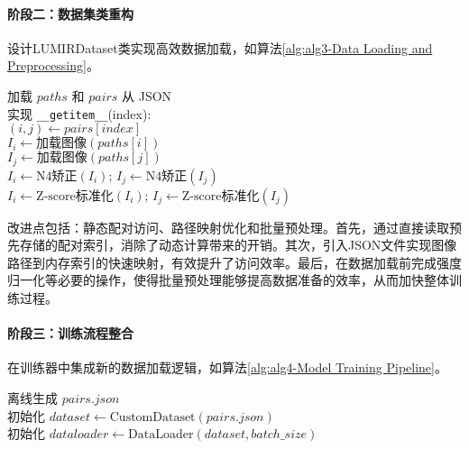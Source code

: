 \paragraph{阶段二：数据集类重构}
设计LUMIRDataset类实现高效数据加载，如算法\ref{alg:alg3-Data Loading and Preprocessing}。

\begin{algorithm}

    \label{alg:alg3-Data Loading and Preprocessing}

    加载 $paths$ 和 $pairs$ 从 JSON \\
    实现 \texttt{\_\_getitem\_\_}(index): \\
    \Indp
    $(i,j) \gets pairs[index]$ \\
    $I_i \gets \text{加载图像}(paths[i])$ \\
    $I_j \gets \text{加载图像}(paths[j])$ \\
    $I_i \gets \text{N4矫正}(I_i)$; $I_j \gets \text{N4矫正}(I_j)$ \\
    $I_i \gets \text{Z-score标准化}(I_i)$; $I_j \gets \text{Z-score标准化}(I_j)$ \\
    
\end{algorithm}

改进点包括：静态配对访问、路径映射优化和批量预处理。首先，通过直接读取预先存储的配对索引，消除了动态计算带来的开销。其次，引入JSON文件实现图像路径到内存索引的快速映射，有效提升了访问效率。最后，在数据加载前完成强度归一化等必要的操作，使得批量预处理能够提高数据准备的效率，从而加快整体训练过程。



\paragraph{阶段三：训练流程整合}
在训练器中集成新的数据加载逻辑，如算法\ref{alg:alg4-Model Training Pipeline}。
\begin{algorithm}

    \label{alg:alg4-Model Training Pipeline}

    离线生成 $pairs.json$ \\
    初始化 $dataset \gets \text{CustomDataset}(pairs.json)$ \\
    初始化 $dataloader \gets \text{DataLoader}(dataset, batch\_size)$ \\
\end{algorithm}


